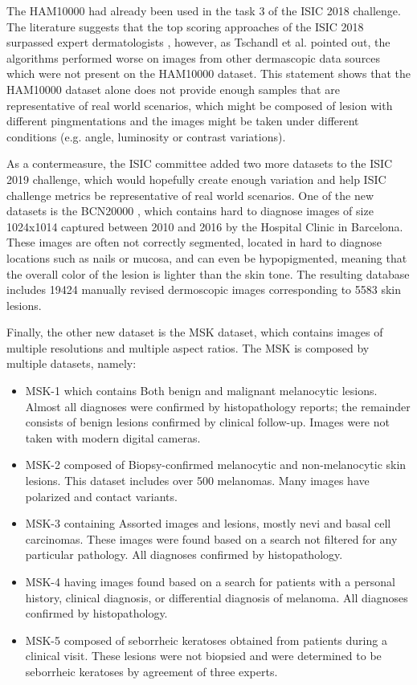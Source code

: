     The \ac{HAM10000} had already been used in the task 3 of the ISIC 2018 challenge. The literature suggests that the top scoring approaches of the ISIC 2018 surpassed expert dermatologists \cite{?}, however, as Tschandl et al. pointed out, the algorithms performed worse on images from other dermascopic data sources which were not present on the \ac{HAM10000} dataset. This statement shows that the \ac{HAM10000} dataset alone does not provide enough samples that are representative of real world scenarios, which might be composed of lesion with different pingmentations and the images might be taken under different conditions (e.g. angle, luminosity or contrast variations). \par
    
    As a contermeasure, the ISIC committee added two more datasets to the ISIC 2019 challenge, which would hopefully create enough variation and help ISIC challenge metrics be representative of real world scenarios. One of the new datasets is the BCN20000 \cite{bcn_20000}, which contains hard to diagnose images of size 1024x1014 captured between 2010 and 2016 by the Hospital Clinic in Barcelona. These images are often not correctly segmented, located in hard to diagnose locations such as nails or mucosa, and can even be hypopigmented, meaning  that the overall color of the lesion is lighter than the skin tone. The resulting database includes 19424 manually revised dermoscopic images corresponding to 5583 skin lesions. \par
    
    Finally, the other new dataset is the MSK \cite{msk} dataset,  which contains images of multiple resolutions and multiple aspect ratios. The MSK is composed by multiple datasets, namely:
    \begin{itemize}
        \item MSK-1 which contains Both benign and malignant melanocytic lesions. Almost all diagnoses were confirmed by histopathology reports; the remainder consists of benign lesions confirmed by clinical follow-up. Images were not taken with modern digital cameras.
        \item MSK-2 composed of Biopsy-confirmed melanocytic and non-melanocytic skin lesions. This dataset includes over 500 melanomas. Many images have polarized and contact variants.
        \item MSK-3 containing Assorted images and lesions, mostly nevi and basal cell carcinomas. These images were found based on a search not filtered for any particular pathology. All diagnoses confirmed by histopathology.
        \item MSK-4 having images found based on a search for patients with a personal history, clinical diagnosis, or differential diagnosis of melanoma. All diagnoses confirmed by histopathology.
        \item MSK-5 composed of seborrheic keratoses obtained from patients during a clinical visit. These lesions were not biopsied and were determined to be seborrheic keratoses by agreement of three experts.
    \end{itemize}
    
